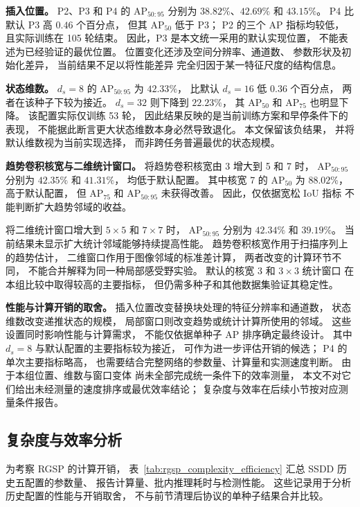 \documentclass[journal]{IEEEtran}
\begin{document}
\textbf{插入位置。}
P2、P3 和 P4 的 $\mathrm{AP}_{50:95}$
分别为 $38.82\%$、$42.69\%$ 和 $43.15\%$。
P4 比默认 P3 高 $0.46$ 个百分点，
但其 $\mathrm{AP}_{50}$ 低于 P3；
P2 的三个 AP 指标均较低，
且实际训练在 105 轮结束。
因此，P3 是本文统一采用的默认实现位置，
不能表述为已经验证的最优位置。
位置变化还涉及空间分辨率、通道数、
参数形状及初始化差异，
当前结果不足以将性能差异
完全归因于某一特征尺度的结构信息。

\textbf{状态维数。}
$d_s=8$ 的 $\mathrm{AP}_{50:95}$ 为 $42.33\%$，
比默认 $d_s=16$ 低 $0.36$ 个百分点，
两者在该种子下较为接近。
$d_s=32$ 则下降到 $22.23\%$，
其 $\mathrm{AP}_{50}$ 和 $\mathrm{AP}_{75}$
也明显下降。
该配置实际仅训练 53 轮，
因此结果反映的是当前训练方案和早停条件下的表现，
不能据此断言更大状态维数本身必然导致退化。
本文保留该负结果，
并将默认维数视为当前实现选择，
而非跨任务普遍最优的状态规模。

\textbf{趋势卷积核宽与二维统计窗口。}
将趋势卷积核宽由 3 增大到 5 和 7 时，
$\mathrm{AP}_{50:95}$ 分别为
$42.35\%$ 和 $41.31\%$，
均低于默认配置。
其中核宽 7 的 $\mathrm{AP}_{50}$ 为 $88.02\%$，
高于默认配置，
但 $\mathrm{AP}_{75}$ 和 $\mathrm{AP}_{50:95}$
未获得改善。
因此，仅依据宽松 IoU 指标
不能判断扩大趋势邻域的收益。

将二维统计窗口增大到
$5\times5$ 和 $7\times7$ 时，
$\mathrm{AP}_{50:95}$ 分别为
$42.34\%$ 和 $39.19\%$。
当前结果未显示扩大统计邻域能够持续提高性能。
趋势卷积核宽作用于扫描序列上的趋势估计，
二维窗口作用于图像邻域的标准差计算，
两者改变的计算环节不同，
不能合并解释为同一种局部感受野实验。
默认的核宽 3 和 $3\times3$ 统计窗口
在本组比较中取得较高的主要指标，
但仍需多种子和其他数据集验证其稳定性。

\textbf{性能与计算开销的取舍。}
插入位置改变替换块处理的特征分辨率和通道数，
状态维数改变递推状态的规模，
局部窗口则改变趋势或统计计算所使用的邻域。
这些设置同时影响性能与计算需求，
不能仅依据单种子 AP 排序确定最终设计。
其中 $d_s=8$ 与默认配置的主要指标较为接近，
可作为进一步评估开销的候选；
P4 的单次主要指标略高，
也需要结合完整网络的参数量、计算量和实测速度判断。
由于本组位置、维数与窗口变体
尚未全部完成统一条件下的效率测量，
本文不对它们给出未经测量的速度排序或最优效率结论；
复杂度与效率在后续小节按对应测量条件报告。

\FloatBarrier
\subsection{复杂度与效率分析}
\label{sec:efficiency}

为考察 RGSP 的计算开销，
表~\ref{tab:rgsp_complexity_efficiency}
汇总 SSDD 历史五配置的参数量、
报告计算量、批内推理耗时与检测性能。
这些记录用于分析历史配置的性能与开销取舍，
不与前节清理后协议的单种子结果合并比较。
\end{document}
